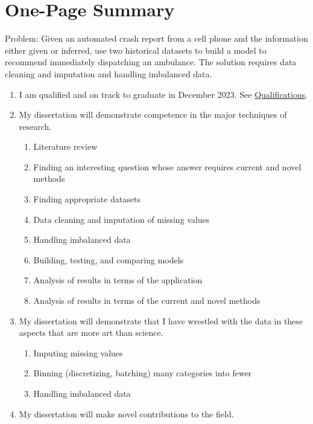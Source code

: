 \section*{One-Page Summary}

Problem:  Given an automated crash report from a cell phone and the information either given or inferred, use two historical datasets to build a model to recommend immediately dispatching an ambulance.  The solution requires data cleaning and imputation and handling imbalanced data.

\begin{enumerate}
	\item I am qualified and on track to graduate in December 2023.  See \hyperref[sec:Qualifications]{Qualifications}.
	\item My dissertation will demonstrate competence in the major techniques of research.
	\begin{enumerate}[label=\alph*., partopsep=0pt,topsep=0pt,parsep=0pt]
		\item Literature review
		\item Finding an interesting question whose answer requires current and novel methods
		\item Finding appropriate datasets
		\item Data cleaning and imputation of missing values
		\item Handling imbalanced data
		\item Building, testing, and comparing models
		\item Analysis of results in terms of the application
		\item Analysis of results in terms of the current and novel methods
	\end{enumerate}
	\item My dissertation will demonstrate that I have wrestled with the data in these aspects that are more art than science.
	\begin{enumerate}[label=\alph*., partopsep=0pt,topsep=0pt,parsep=0pt]
		\item Imputing missing values
		\item Binning (discretizing, batching) many categories into fewer
		\item Handling imbalanced data
	\end{enumerate}
	\item My dissertation will make novel contributions to the field.
	\begin{enumerate}[label=\alph*., partopsep=0pt,topsep=0pt,parsep=0pt]

\end{enumerate}
\end{enumerate}
